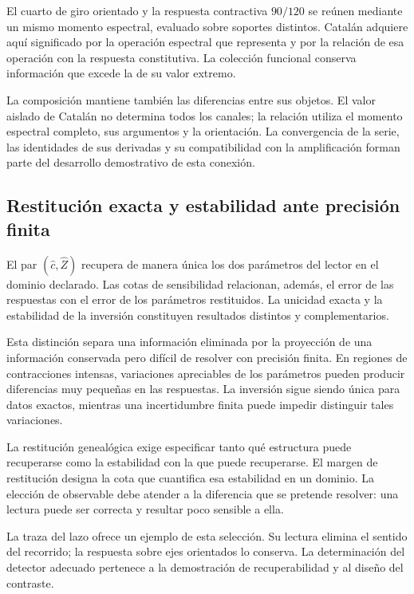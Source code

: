 El cuarto de giro orientado y la respuesta contractiva $90/120$
se reúnen mediante un mismo momento espectral, evaluado sobre
soportes distintos. Catalán adquiere aquí significado por la
operación espectral que representa y por la relación de esa
operación con la respuesta constitutiva. La colección funcional
conserva información que excede la de su valor extremo.

La composición mantiene también las diferencias entre sus objetos.
El valor aislado de Catalán no determina todos los canales;
la relación utiliza el momento espectral completo, sus argumentos
y la orientación. La convergencia de la serie, las identidades
de sus derivadas y su compatibilidad con la amplificación forman
parte del desarrollo demostrativo de esta conexión.

\subsection{Restitución exacta y estabilidad ante precisión finita}
\label{subsec:narrativa-estabilidad-restitucion}

El par $(\widehat c,\widehat Z)$ recupera de manera única los dos
parámetros del lector en el dominio declarado. Las cotas de
sensibilidad relacionan, además, el error de las respuestas con
el error de los parámetros restituidos. La unicidad exacta y la
estabilidad de la inversión constituyen resultados distintos y
complementarios.

Esta distinción separa una información eliminada por la proyección
de una información conservada pero difícil de resolver con precisión
finita. En regiones de contracciones intensas, variaciones apreciables
de los parámetros pueden producir diferencias muy pequeñas en las
respuestas. La inversión sigue siendo única para datos exactos,
mientras una incertidumbre finita puede impedir distinguir tales
variaciones.

La restitución genealógica exige especificar tanto qué estructura
puede recuperarse como la estabilidad con la que puede recuperarse.
El margen de restitución designa la cota que cuantifica esa estabilidad
en un dominio. La elección de observable debe atender a la diferencia
que se pretende resolver: una lectura puede ser correcta y resultar
poco sensible a ella.

La traza del lazo ofrece un ejemplo de esta selección. Su lectura
elimina el sentido del recorrido; la respuesta sobre ejes orientados
lo conserva. La determinación del detector adecuado pertenece a
la demostración de recuperabilidad y al diseño del contraste.

